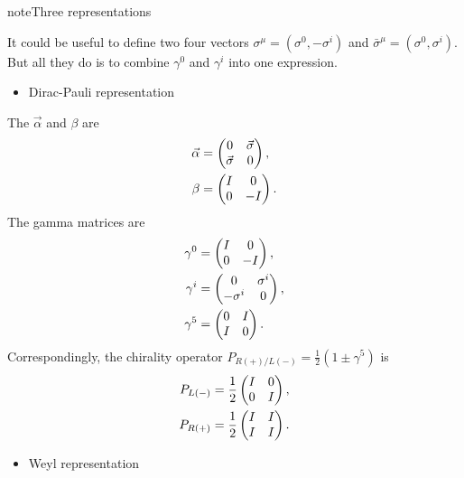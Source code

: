 \documentclass[letterpaper,12pt,english]{sphinxmanual}
\begin{document}
\begin{notice}{note}{Three representations}

It could be useful to define two four vectors \(\sigma^\mu = (\sigma^0, - \sigma^i)\) and \(\bar\sigma^\mu = (\sigma^0, \sigma^i)\). But all they do is to combine \(\gamma^0\) and \(\gamma^i\) into one expression.
\begin{itemize}
\item {} 
Dirac-Pauli representation

\end{itemize}

The \(\vec\alpha\) and \(\beta\) are
\begin{gather}
\begin{split}\vec \alpha &= \begin{pmatrix} 0 & \vec \sigma \\ \vec\sigma & 0 \end{pmatrix}, \\
\beta & = \begin{pmatrix} I & 0 \\ 0 & -I \end{pmatrix}.\end{split}\notag
\end{gather}
The gamma matrices are
\begin{gather}
\begin{split}\gamma^0 & = \begin{pmatrix} I & 0 \\ 0 & -I  \end{pmatrix}, \\
\gamma^i & = \begin{pmatrix} 0 & \sigma^i \\ -\sigma^i & 0 \end{pmatrix}, \\
\gamma^5 & = \begin{pmatrix} 0 & I \\ I & 0 \end{pmatrix}.\end{split}\notag
\end{gather}
Correspondingly, the chirality operator \(P_{R(+)/L(-)} = \frac{1}{2}(1\pm \gamma^5)\) is
\begin{gather}
\begin{split}P_{L(-)} &=\frac{1}{2} \begin{pmatrix} I & 0 \\ 0 & I  \end{pmatrix},\\
P_{R(+)} & = \frac{1}{2} \begin{pmatrix} I & I  \\ I & I \end{pmatrix}.\end{split}\notag
\end{gather}\begin{itemize}
\item {} 
Weyl representation


\end{itemize}
\end{notice}
\end{document}
